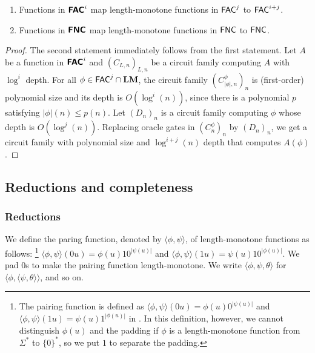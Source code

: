 \documentclass[envcountsame,orivec,oribibl]{llncs}
\begin{document}
\begin{corollary}
\mbox{}
\begin{enumerate}
 \item Functions in $\text{\bfseries \sffamily \upshape FAC}^i$ 
       map length-monotone functions in $\mathsf{FAC}^j$ 
       to $\mathsf{FAC}^{i+j}$.
 \item Functions in $\text{\bfseries \sffamily \upshape FNC}$
       map length-monotone functions in $\mathsf{FNC}$ 
       to $\mathsf{FNC}$.
\end{enumerate}
\end{corollary}

\begin{proof}
The second statement immediately follows from the first statement.
Let $A$ be a function in $\text{\bfseries \sffamily \upshape FAC}^i$ and $(C_{L,n})_{L,n}$ be a circuit
family computing $A$ with $\log^i$ depth.
For all $\phi \in \mathsf{FAC}^j \cap \mathbf{LM}$, 
the circuit family $(C^\phi_{|\phi|,n})_n$ is (first-order) polynomial size and its depth is $O(\log^i(n))$,
since there is a polynomial $p$ satisfying $|\phi|(n) \le p(n)$.
Let $(D_n)_n$ is a circuit family computing $\phi$ whose depth is $O(\log^j(n))$.
Replacing oracle gates in $(C^\phi_n)_n$ by $(D_n)_n$, 
we get a circuit family with polynomial size and $\log^{i+j}(n)$ depth
that computes $A(\phi)$.
\end{proof}




\subsection{Reductions and completeness}

\subsubsection{Reductions}
We define the paring function, denoted by $\langle \phi, \psi \rangle$,
of length-monotone functions as follows:%
\footnote{
The pairing function is defined as
$\langle \phi, \psi \rangle(0u) = \phi(u) 0^{|\psi(u)|}$
and 
$\langle \phi, \psi \rangle(1u) = \psi(u) 1^{|\phi(u)|}$ 
in \cite{kawamura2010complexity}.
In this definition, however, we cannot distinguish $\phi(u)$ and the padding
if $\phi$ is a length-monotone function from $\Sigma^*$ to $\{0\}^*$,
so we put $1$ to separate the padding.
}
$\langle \phi, \psi \rangle(0u) = \phi(u) 10^{|\psi(u)|}$ and 
$\langle \phi, \psi \rangle(1u) = \psi(u) 10^{|\phi(u)|}$.
We pad $0$s to make the pairing function length-monotone.
We write $\langle \phi, \psi, \theta \rangle$ 
for $\langle \phi, \langle \psi, \theta \rangle \rangle$, and so on.
\end{document}
